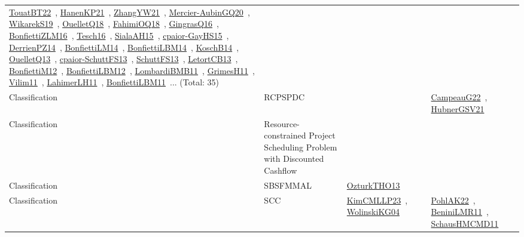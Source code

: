 {\begin{longtable}{lp{3cm}>{\raggedright\arraybackslash}p{6cm}>{\raggedright\arraybackslash}p{6cm}>{\raggedright\arraybackslash}p{8cm}}
\href{papers/TouatBT22.pdf}{TouatBT22}~\cite{TouatBT22}, \href{papers/HanenKP21.pdf}{HanenKP21}~\cite{HanenKP21}, \href{articles/ZhangYW21.pdf}{ZhangYW21}~\cite{ZhangYW21}, \href{papers/Mercier-AubinGQ20.pdf}{Mercier-AubinGQ20}~\cite{Mercier-AubinGQ20}, \href{articles/WikarekS19.pdf}{WikarekS19}~\cite{WikarekS19}, \href{papers/OuelletQ18.pdf}{OuelletQ18}~\cite{OuelletQ18}, \href{articles/FahimiOQ18.pdf}{FahimiOQ18}~\cite{FahimiOQ18}, \href{papers/GingrasQ16.pdf}{GingrasQ16}~\cite{GingrasQ16}, \href{papers/BonfiettiZLM16.pdf}{BonfiettiZLM16}~\cite{BonfiettiZLM16}, \href{papers/Tesch16.pdf}{Tesch16}~\cite{Tesch16}, \href{papers/SialaAH15.pdf}{SialaAH15}~\cite{SialaAH15}, \href{papers/cpaior-GayHS15.pdf}{cpaior-GayHS15}~\cite{cpaior-GayHS15}, \href{papers/DerrienPZ14.pdf}{DerrienPZ14}~\cite{DerrienPZ14}, \href{papers/BonfiettiLM14.pdf}{BonfiettiLM14}~\cite{BonfiettiLM14}, \href{articles/BonfiettiLBM14.pdf}{BonfiettiLBM14}~\cite{BonfiettiLBM14}, \href{papers/KoschB14.pdf}{KoschB14}~\cite{KoschB14}, \href{papers/OuelletQ13.pdf}{OuelletQ13}~\cite{OuelletQ13}, \href{papers/cpaior-SchuttFS13.pdf}{cpaior-SchuttFS13}~\cite{cpaior-SchuttFS13}, \href{papers/SchuttFS13.pdf}{SchuttFS13}~\cite{SchuttFS13}, \href{papers/LetortCB13.pdf}{LetortCB13}~\cite{LetortCB13}, \href{papers/BonfiettiM12.pdf}{BonfiettiM12}~\cite{BonfiettiM12}, \href{papers/BonfiettiLBM12.pdf}{BonfiettiLBM12}~\cite{BonfiettiLBM12}, \href{papers/LombardiBMB11.pdf}{LombardiBMB11}~\cite{LombardiBMB11}, \href{papers/GrimesH11.pdf}{GrimesH11}~\cite{GrimesH11}, \href{papers/Vilim11.pdf}{Vilim11}~\cite{Vilim11}, \href{papers/LahimerLH11.pdf}{LahimerLH11}~\cite{LahimerLH11}, \href{papers/BonfiettiLBM11.pdf}{BonfiettiLBM11}~\cite{BonfiettiLBM11}... (Total: 35)\\
Classification & RCPSPDC &  &  & \href{articles/CampeauG22.pdf}{CampeauG22}~\cite{CampeauG22}, \href{articles/HubnerGSV21.pdf}{HubnerGSV21}~\cite{HubnerGSV21}\\
Classification & Resource-constrained Project Scheduling Problem with Discounted Cashflow &  &  & \\
Classification & SBSFMMAL & \href{articles/OzturkTHO13.pdf}{OzturkTHO13}~\cite{OzturkTHO13} &  & \\
Classification & SCC & \href{papers/KimCMLLP23.pdf}{KimCMLLP23}~\cite{KimCMLLP23}, \href{papers/WolinskiKG04.pdf}{WolinskiKG04}~\cite{WolinskiKG04} &  & \href{articles/PohlAK22.pdf}{PohlAK22}~\cite{PohlAK22}, \href{articles/BeniniLMR11.pdf}{BeniniLMR11}~\cite{BeniniLMR11}, \href{articles/SchausHMCMD11.pdf}{SchausHMCMD11}~\cite{SchausHMCMD11}\\

\end{longtable}}
